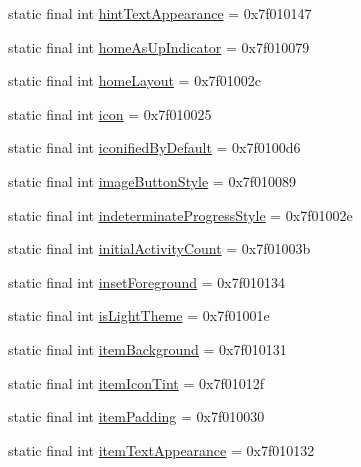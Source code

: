 \begin{CompactItemize}
\item 
static final int \hyperlink{classandroid_1_1support_1_1coreutils_1_1_r_1_1attr_1a8d5a107958a5e6d474258bc177e9a8}{hintTextAppearance} = 0x7f010147
\item 
static final int \hyperlink{classandroid_1_1support_1_1coreutils_1_1_r_1_1attr_e39725b5ec31c295c80034a4ba8bdb52}{homeAsUpIndicator} = 0x7f010079
\item 
static final int \hyperlink{classandroid_1_1support_1_1coreutils_1_1_r_1_1attr_e8117144b602fa5827279751042173d4}{homeLayout} = 0x7f01002c
\item 
static final int \hyperlink{classandroid_1_1support_1_1coreutils_1_1_r_1_1attr_8570e803a076dfcc8b6e52a56a78636b}{icon} = 0x7f010025
\item 
static final int \hyperlink{classandroid_1_1support_1_1coreutils_1_1_r_1_1attr_d6fa93c51a0f1e9105e089e70a49cf5a}{iconifiedByDefault} = 0x7f0100d6
\item 
static final int \hyperlink{classandroid_1_1support_1_1coreutils_1_1_r_1_1attr_b1370794750a6d010ffd4b8590164854}{imageButtonStyle} = 0x7f010089
\item 
static final int \hyperlink{classandroid_1_1support_1_1coreutils_1_1_r_1_1attr_67651f9872f56e46a6c135991234a189}{indeterminateProgressStyle} = 0x7f01002e
\item 
static final int \hyperlink{classandroid_1_1support_1_1coreutils_1_1_r_1_1attr_3ec5484954ea38f40db49d1e2063b17f}{initialActivityCount} = 0x7f01003b
\item 
static final int \hyperlink{classandroid_1_1support_1_1coreutils_1_1_r_1_1attr_8f05f3facd59ae773f76b979155b78bb}{insetForeground} = 0x7f010134
\item 
static final int \hyperlink{classandroid_1_1support_1_1coreutils_1_1_r_1_1attr_bf1d95df0b461a6b964cdf1115d4d59f}{isLightTheme} = 0x7f01001e
\item 
static final int \hyperlink{classandroid_1_1support_1_1coreutils_1_1_r_1_1attr_83b206fbc7969ad15b2379937c984b4b}{itemBackground} = 0x7f010131
\item 
static final int \hyperlink{classandroid_1_1support_1_1coreutils_1_1_r_1_1attr_a741367453212c3205e6ae8794dfc1da}{itemIconTint} = 0x7f01012f
\item 
static final int \hyperlink{classandroid_1_1support_1_1coreutils_1_1_r_1_1attr_4c2408ef52203b02095fa7b863585868}{itemPadding} = 0x7f010030
\item 
static final int \hyperlink{classandroid_1_1support_1_1coreutils_1_1_r_1_1attr_8ffdaaa55986f7596a85d6633d25e631}{itemTextAppearance} = 0x7f010132

\end{CompactItemize}
